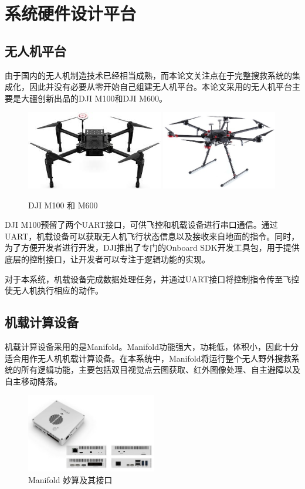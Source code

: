 \chapter{系统硬件设计平台}
\thispagestyle{fancy}


\section{无人机平台}


由于国内的无人机制造技术已经相当成熟，而本论文关注点在于完整搜救系统的集成化，因此并没有必要从零开始自己组建无人机平台。本论文采用的无人机平台主要是大疆创新出品的DJI M100和DJI M600。

\begin{figure}[h]
    \centering
    \includegraphics[height=3.43cm]{figures/3-1-M100.jpg}
    \includegraphics[height=3.43cm]{figures/3-1-M600.jpg}
    \caption{DJI M100 和 M600}\label{DJI-M100}
\end{figure}

DJI M100预留了两个UART接口，可供飞控和机载设备进行串口通信。通过UART，机载设备可以获取无人机飞行状态信息以及接收来自地面的指令。同时，为了方便开发者进行开发，DJI推出了专门的Onboard SDK开发工具包，用于提供底层的控制接口，让开发者可以专注于逻辑功能的实现。

对于本系统，机载设备完成数据处理任务，并通过UART接口将控制指令传至飞控使无人机执行相应的动作。

\section{机载计算设备}


机载计算设备采用的是Manifold。Manifold功能强大，功耗低，体积小，因此十分适合用作无人机机载计算设备。在本系统中，Manifold将运行整个无人野外搜救系统的所有逻辑功能，主要包括双目视觉点云图获取、红外图像处理、自主避障以及自主移动降落。
\begin{figure}[h]
    \centering
    \includegraphics[height=3.43cm]{figures/3-2-Manifold.jpg}
    \caption{Manifold 妙算及其接口}\label{Manifold}
\end{figure}


